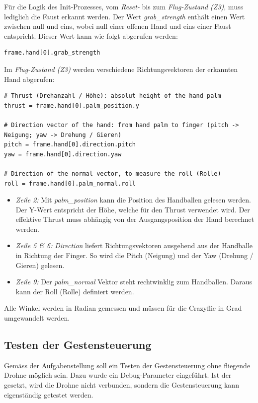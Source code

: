Für die Logik des Init-Prozesses, vom \textit{Reset-} bis zum \textit{Flug-Zustand (Z3)}, muss lediglich die Faust erkannt werden.
Der Wert \textit{grab\_strength} enthält einen Wert zwischen null und eins, wobei null einer offenen Hand und eins einer Faust entspricht.
Dieser Wert kann wie folgt abgerufen werden:

\begin{lstlisting}[style=lstStyleCpp]
frame.hand[0].grab_strength
\end{lstlisting}

Im \textit{Flug-Zustand (Z3)} werden verschiedene Richtungsvektoren der erkannten Hand abgerufen:

\begin{lstlisting}[style=lstStyleCpp]
# Thrust (Drehanzahl / Höhe): absolut height of the hand palm
thrust = frame.hand[0].palm_position.y

# Direction vector of the hand: from hand palm to finger (pitch -> Neigung; yaw -> Drehung / Gieren)
pitch = frame.hand[0].direction.pitch
yaw = frame.hand[0].direction.yaw

# Direction of the normal vector, to measure the roll (Rolle)
roll = frame.hand[0].palm_normal.roll
\end{lstlisting}

\begin{itemize}
	\item \textit{Zeile 2:}
	Mit \textit{palm\_position} kann die Position des Handballen gelesen werden.
	Der Y-Wert entspricht der Höhe, welche für den Thrust verwendet wird.
	Der effektive Thrust muss abhängig von der Ausgangsposition der Hand berechnet werden.

	\item \textit{Zeile 5 \& 6:}
	\textit{Direction} liefert Richtungsvektoren ausgehend aus der Handballe in Richtung der Finger. So wird die Pitch (Neigung) und der Yaw (Drehung / Gieren) gelesen.

	\item \textit{Zeile 9:}
	Der \textit{palm\_normal} Vektor steht rechtwinklig zum Handballen. Daraus kann der Roll (Rolle) definiert werden.
\end{itemize}

Alle Winkel werden in Radian gemessen und müssen für die Crazyflie in Grad umgewandelt werden.

\subsection{Testen der Gestensteuerung}
Gemäss der Aufgabenstellung soll ein Testen der Gestensteuerung ohne fliegende Drohne möglich sein.
Dazu wurde ein Debug-Parameter eingeführt.
Ist der gesetzt, wird die Drohne nicht verbunden, sondern die Gestensteuerung kann eigenständig getestet werden.

